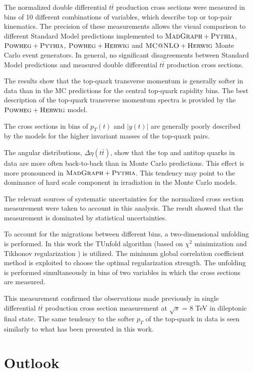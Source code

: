 The normalized double differential $t\bar{t}$ production cross sections were measured in bins of 10 different combinations of
variables, which describe top or top-pair kinematics. The precision of these measurements allows the visual comparison to different 
Standard Model predictions implemented to $\textsc{MadGraph}+\textsc{Pythia}$, $\textsc{Powheg}+\textsc{Pythia}$, $\textsc{Powheg}+\textsc{Herwig}$ and $\textsc{MC@NLO}+\textsc{Herwig}$ Monte Carlo
event generators. In general, no significant disagreements between Standard Model predictions and measured double differential
$t\bar{t}$ production cross sections.

The results show that the top-quark transverse momentum is generally softer in data than in the MC predictions for the central
top-quark rapidity bins. The best description of the top-quark transverse momentum spectra is provided by the $\textsc{Powheg}+\textsc{Herwig}$
model.

The cross sections in bins of $p_{T}(t)$ and $|y(t)|$ are generally poorly described by the models for the higher invariant masses
of the top-quark pairs.

The angular distributions, $\Delta\eta(t\bar{t})$, show that the top and antitop quarks in data are more often back-to-back
than in Monte Carlo predictions. This effect is more pronounced in $\textsc{MadGraph}+\textsc{Pythia}$. This tendency may point to the dominance of
hard scale component in irradiation in the Monte Carlo models.

The relevant sources of systematic uncertainties for the normalized cross section measurement were taken to account in this analysis.
The result showed that the measurement is dominated by statistical uncertainties.

To account for the migrations between different bins, a two-dimensional unfolding is performed. In this work the TUnfold 
algorithm\cite{Schmitt:2012kp} (based on $\chi^{2}$ minimization and Tikhonov regularization \cite{Tikhonov:1963}) is utilized. 
The minimum global correlation coefficient method\cite{VBlobelT} is exploited to choose the 
optimal regularization strength. The unfolding is performed simultaneously in bins of two variables in which the cross
sections are measured.

This measurement confirmed the observations made previously in single differential $t\bar{t}$ production cross section measurement
at $\sqrt{s}$ = 8 TeV\cite{Asin2014Auth} in dileptonic final state. The same tendency to the softer $p_{T}$ of the top-quark in 
data is seen similarly to what has been presented in this work.

\section{Outlook}

